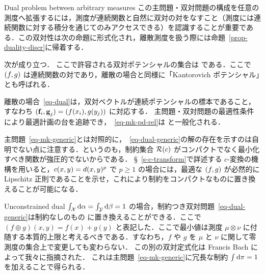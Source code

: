 \begin{rem2}{Dual problem between arbitrary measures}
	この主問題・双対問題の構成を任意の測度へ拡張するには，測度が連続関数と自然に双対の対をなすこと（測度には連続関数に対する積分を通じてのみアクセスできる）を認識することが重要である．この双対性は次の命題に形式化され，離散測度を扱う際には命題~\ref{prop-duality-discr}に帰着する．

	\begin{prop}
	次が成り立つ．
	ここで許容される双対ポテンシャルの集合は
	である．ここで $(f,g)$ は連続関数の対であり，離散の場合と同様に「Kantorovich ポテンシャル」とも呼ばれる．
	\end{prop}


	離散の場合~\eqref{eq-dual}は，双対ベクトルが連続ポテンシャルの標本であること，すなわち $(\mathrm{\textbf{f}}_i,\mathrm{\textbf{g}}_j)=(f(x_i),g(y_j))$ に対応する．
	主問題・双対問題の最適性条件により最適計画の台を追跡でき，~\eqref{eq-mk-pd-rel}は
	と一般化される．

	主問題~\eqref{eq-mk-generic}とは対照的に，~\eqref{eq-dual-generic}の解の存在を示すのは自明でない点に注意する．というのも，制約集合 $\mathcal{R}(c)$ がコンパクトでなく最小化すべき関数が強圧的でないからである．
	\S~\ref{s-c-transform}で詳述する $c$-変換の機構を用いると，$c(x,y)=d(x,y)^p$ で $p\geq 1$ の場合には，最適な $(f,g)$ が必然的に Lipschitz 正則であることを示せ，これにより制約をコンパクトなものに置き換えることが可能になる．
\end{rem2}

\begin{rem2}{Unconstrained dual}\label{rem-uncons-dual}
$\int_{\mathcal{X}} \mathrm{d}\alpha=\int_{\mathcal{Y}}\mathrm{d}\beta = 1$ の場合，制約つき双対問題~\eqref{eq-dual-generic}は制約なしのもの
に置き換えることができる．ここで $(f\oplus g)(x,y)=f(x)+g(y)$ と表記した．ここで最小値は測度 $\mu \otimes \nu$ に付随する本質的上限と考えるべきである．すなわち，$f$ や $g$ を $\mu$ と $\nu$ に関して零測度の集合上で変更しても変わらない．
%
この別の双対定式化は Francis Bach によって我々に指摘された．
%
これは主問題~\eqref{eq-mk-generic}に冗長な制約 $\int \mathrm{d}\pi=1$ を加えることで得られる．
\end{rem2}


